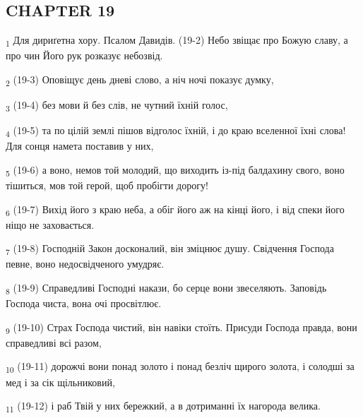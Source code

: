 \subsection{CHAPTER 19}
\begin{tcolorbox}
\textsubscript{1} Для дириґетна хору. Псалом Давидів. (19-2) Небо звіщає про Божую славу, а про чин Його рук розказує небозвід.
\end{tcolorbox}
\begin{tcolorbox}
\textsubscript{2} (19-3) Оповіщує день дневі слово, а ніч ночі показує думку,
\end{tcolorbox}
\begin{tcolorbox}
\textsubscript{3} (19-4) без мови й без слів, не чутний їхній голос,
\end{tcolorbox}
\begin{tcolorbox}
\textsubscript{4} (19-5) та по цілій землі пішов відголос їхній, і до краю вселенної їхні слова! Для сонця намета поставив у них,
\end{tcolorbox}
\begin{tcolorbox}
\textsubscript{5} (19-6) а воно, немов той молодий, що виходить із-під балдахину свого, воно тішиться, мов той герой, щоб пробігти дорогу!
\end{tcolorbox}
\begin{tcolorbox}
\textsubscript{6} (19-7) Вихід його з краю неба, а обіг його аж на кінці його, і від спеки його ніщо не заховається.
\end{tcolorbox}
\begin{tcolorbox}
\textsubscript{7} (19-8) Господній Закон досконалий, він зміцнює душу. Свідчення Господа певне, воно недосвідченого умудряє.
\end{tcolorbox}
\begin{tcolorbox}
\textsubscript{8} (19-9) Справедливі Господні накази, бо серце вони звеселяють. Заповідь Господа чиста, вона очі просвітлює.
\end{tcolorbox}
\begin{tcolorbox}
\textsubscript{9} (19-10) Страх Господа чистий, він навіки стоїть. Присуди Господа правда, вони справедливі всі разом,
\end{tcolorbox}
\begin{tcolorbox}
\textsubscript{10} (19-11) дорожчі вони понад золото і понад безліч щирого золота, і солодші за мед і за сік щільниковий,
\end{tcolorbox}
\begin{tcolorbox}
\textsubscript{11} (19-12) і раб Твій у них бережкий, а в дотриманні їх нагорода велика.
\end{tcolorbox}
